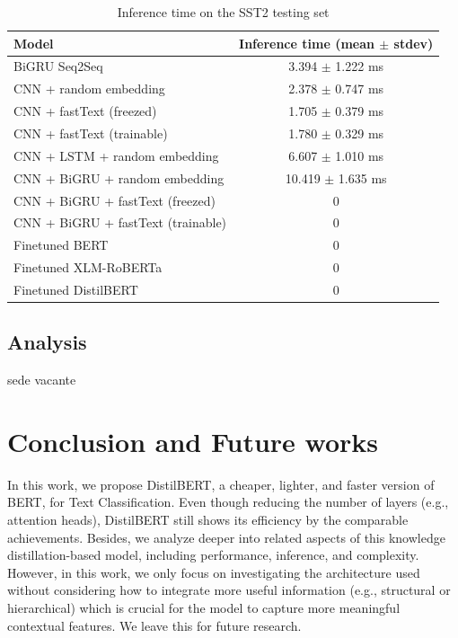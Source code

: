 \documentclass[sn-mathphys,Numbered]{sn-jnl}%
\theoremstyle{thmstyleone}%
\theoremstyle{thmstyletwo}%
\theoremstyle{thmstylethree}%
\begin{document}
\begin{table}
\caption{Inference time on the SST2 testing set}\label{tab:inference-SST2}
\begin{tabular*}{\textwidth}{@{\extracolsep\fill}lc}
\toprule
\textbf{Model}                     & \textbf{Inference time (mean $\pm$ stdev)} \\ \midrule
BiGRU Seq2Seq                      & 3.394 $\pm$ 1.222 ms                     \\ \midrule
CNN + random embedding             & 2.378 $\pm$ 0.747 ms                     \\
CNN + fastText (freezed)           & 1.705 $\pm$ 0.379 ms                     \\
CNN + fastText (trainable)         & 1.780 $\pm$ 0.329 ms                     \\ \midrule
CNN + LSTM + random embedding      & 6.607 $\pm$ 1.010 ms                     \\
CNN + BiGRU + random embedding     & 10.419 $\pm$ 1.635 ms                    \\
CNN + BiGRU + fastText (freezed)   & 0                    \\
CNN + BiGRU + fastText (trainable) & 0 \\ \midrule
Finetuned BERT                     & 0  \\
Finetuned XLM-RoBERTa              & 0  \\ \midrule
Finetuned DistilBERT\footnotemark[1]               & 0 \\ \bottomrule
\end{tabular*}
\end{table}

\subsection{Analysis}
sede vacante

\section{Conclusion and Future works}\label{conclusionandfutureworks}
In this work, we propose DistilBERT, a cheaper, lighter, and faster version of BERT, for Text Classification. Even though reducing the number of layers (e.g., attention heads), DistilBERT still shows its efficiency by the comparable achievements. Besides, we analyze deeper into related aspects of this knowledge distillation-based model, including performance, inference, and complexity. However, in this work, we only focus on investigating the architecture used without considering how to integrate more useful information (e.g., structural or hierarchical) which is crucial for the model to capture more meaningful contextual features. We leave this for future research.
\end{document}
